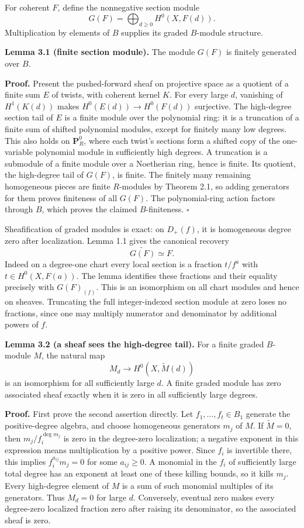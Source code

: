 \documentclass[11pt]{article}
\begin{document}
For coherent \(F\), define the nonnegative section module \[
G(F)=\bigoplus_{d\ge0}H^0(X,F(d)).
\] Multiplication by elements of \(B\) supplies its graded \(B\)-module
structure.

\textbf{Lemma 3.1 (finite section module).} The module \(G(F)\) is
finitely generated over \(B\).

\textbf{Proof.} Present the pushed-forward sheaf on projective space as
a quotient of a finite sum \(E\) of twists, with coherent kernel \(K\).
For every large \(d\), vanishing of \(H^1(K(d))\) makes
\(H^0(E(d))\to H^0(F(d))\) surjective. The high-degree section tail of
\(E\) is a finite module over the polynomial ring: it is a truncation of
a finite sum of shifted polynomial modules, except for finitely many low
degrees. This also holds on \(\mathbf P_R^0\), where each twist's
sections form a shifted copy of the one-variable polynomial module in
sufficiently high degrees. A truncation is a submodule of a finite
module over a Noetherian ring, hence is finite. Its quotient, the
high-degree tail of \(G(F)\), is finite. The finitely many remaining
homogeneous pieces are finite \(R\)-modules by Theorem 2.1, so adding
generators for them proves finiteness of all \(G(F)\). The
polynomial-ring action factors through \(B\), which proves the claimed
\(B\)-finiteness. \(\square\)

Sheafification of graded modules is exact: on \(D_+(f)\), it is
homogeneous degree zero after localization. Lemma 1.1 gives the
canonical recovery \[
\widetilde{G(F)}\simeq F.
\] Indeed on a degree-one chart every local section is a fraction
\(t/f^a\) with \(t\in H^0(X,F(a))\). The lemma identifies these
fractions and their equality precisely with \(G(F)_{(f)}\). This is an
isomorphism on all chart modules and hence on sheaves. Truncating the
full integer-indexed section module at zero loses no fractions, since
one may multiply numerator and denominator by additional powers of
\(f\).

\textbf{Lemma 3.2 (a sheaf sees the high-degree tail).} For a finite
graded \(B\)-module \(M\), the natural map \[
M_d\longrightarrow H^0(X,\widetilde M(d))
\] is an isomorphism for all sufficiently large \(d\). A finite graded
module has zero associated sheaf exactly when it is zero in all
sufficiently large degrees.

\textbf{Proof.} First prove the second assertion directly. Let
\(f_1,\ldots,f_t\in B_1\) generate the positive-degree algebra, and
choose homogeneous generators \(m_j\) of \(M\). If \(\widetilde M=0\),
then \(m_j/f_i^{\deg m_j}\) is zero in the degree-zero localization; a
negative exponent in this expression means multiplication by a positive
power. Since \(f_i\) is invertible there, this implies
\(f_i^{a_{ij}}m_j=0\) for some \(a_{ij}\ge0\). A monomial in the \(f_i\)
of sufficiently large total degree has an exponent at least one of these
killing bounds, so it kills \(m_j\). Every high-degree element of \(M\)
is a sum of such monomial multiples of its generators. Thus \(M_d=0\)
for large \(d\). Conversely, eventual zero makes every degree-zero
localized fraction zero after raising its denominator, so the associated
sheaf is zero.
\end{document}
